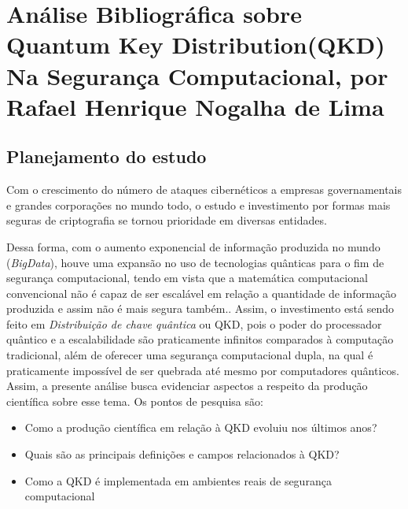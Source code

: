 \chapter{Análise Bibliográfica sobre Quantum Key Distribution(QKD) Na Segurança Computacional, por Rafael Henrique Nogalha de Lima}

\section{Planejamento do estudo}

Com o crescimento do número de ataques cibernéticos a empresas governamentais e grandes corporações no mundo todo, o estudo e investimento por formas mais seguras de criptografia se tornou prioridade em diversas entidades. 

Dessa forma, com o aumento exponencial de informação produzida no mundo (\textit{BigData}), houve uma expansão no uso de tecnologias quânticas para o fim de segurança computacional, tendo em vista que a matemática computacional convencional não é capaz de ser escalável em relação a quantidade de informação produzida e assim não é mais segura também.. Assim, o investimento está sendo feito em \textit{Distribuição de chave quântica} ou QKD, pois o poder do processador quântico e a escalabilidade são praticamente infinitos comparados à computação tradicional, além de oferecer uma segurança computacional dupla, na qual é praticamente impossível de ser quebrada até mesmo por computadores quânticos. Assim, a presente análise busca evidenciar aspectos a respeito da produção científica sobre esse tema. Os pontos de pesquisa são:

\begin{itemize}
    \item Como a produção científica em relação à QKD evoluiu nos últimos anos?
    \item Quais são as principais definições e campos relacionados à QKD?
    \item Como a QKD é implementada em ambientes reais de segurança computacional
\end{itemize}